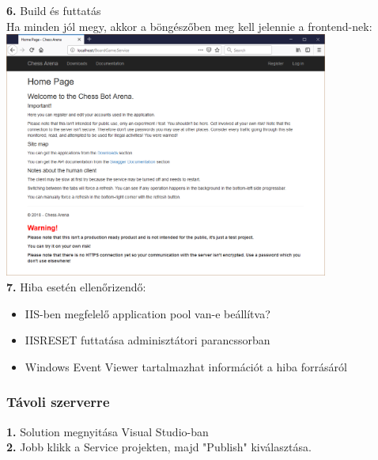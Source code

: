 \documentclass[twoside, a4paper, 12pt]{article}
\begin{document}
\noindent \textbf{6.} Build és futtatás \\
Ha minden jól megy, akkor a böngészőben meg kell jelennie a frontend-nek: \\
\includegraphics[width=0.8\textwidth]{img/server_dev_run_5.png} \\

\noindent \textbf{7.} Hiba esetén ellenőrizendő:
\begin{itemize}
	\item IIS-ben megfelelő application pool van-e beállítva?
	\item IISRESET futtatása adminisztátori parancssorban
	\item Windows Event Viewer tartalmazhat információt a hiba forrásáról
\end{itemize}





\subsubsection{Távoli szerverre}
\noindent \textbf{1.} Solution megnyitása Visual Studio-ban \\

\noindent \textbf{2.} Jobb klikk a Service projekten, majd "Publish" kiválasztása. \\
\end{document}
